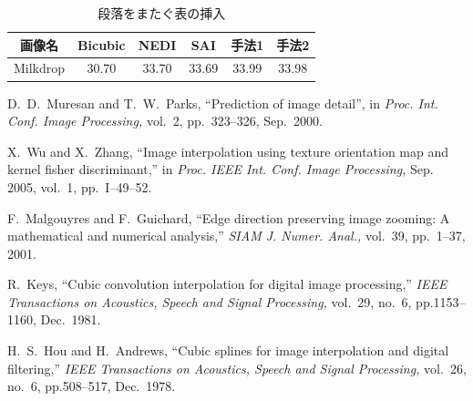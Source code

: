 \documentclass[a4paper,10pt]{ikelab-seminar}
\begin{document}
\begin{table}[t]
   \centering
   \caption{段落をまたぐ表の挿入}
   \label{tbl:example-span}
   \begin{tabular}{c|ccccc}
      \hline
      画像名   & Bicubic &  NEDI &  SAI  & 手法1 & 手法2 \\
      \hline
      Milkdrop &  30.70  & 33.70 & 33.69 & 33.99 & 33.98 \\
      \hline 
   \end{tabular}
\end{table}


\begin{thebibliography}{99} %

      D.~D.~Muresan and T.~W.~Parks, 
      ``Prediction of image detail'', in 
      \textit{Proc. Int. Conf. Image Processing,} vol.~2,
      pp.~323--326, Sep.~2000.

      X.~Wu and X.~Zhang,
      ``Image interpolation using texture orientation map 
           and kernel fisher discriminant,''
      in \textit{Proc. IEEE Int. Conf. Image Processing,} 
      Sep. 2005, vol.~1, pp.~I--49--52.

      F.~Malgouyres and F.~Guichard,
      ``Edge direction preserving image zooming: 
           A mathematical and numerical analysis,''
      \textit{SIAM J. Numer. Anal.,}
      vol.~39, pp.~1--37, 2001.

     R.~Keys,
     ``Cubic convolution interpolation for digital image processing,''
     \textit{IEEE Transactions on Acoustics, Speech and Signal Processing,}
     vol.~29, no.~6, pp.1153--1160, Dec.\ 1981.

     H.~S.~Hou and H.~Andrews,
     ``Cubic splines for image interpolation and digital filtering,''
     \textit{IEEE Transactions on Acoustics, Speech and Signal Processing,}
     vol.~26, no.~6, pp.508--517, Dec.\ 1978.


\end{thebibliography}
\end{document}
